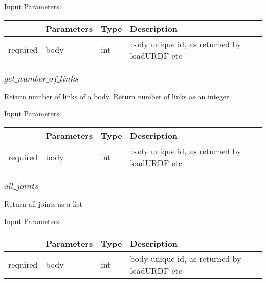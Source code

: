 \documentclass[
	ngerman,
	accentcolor=9c,%
	type=intern,
	marginpar=false
	]{tudapub}
\begin{document}
\vspace{0.5cm}
\noindent Input Parameters:
\vspace{0.5cm}

\begin{tabular}{|p{}|p{}|p{}| p{}|}
\hline
 & \textbf{Parameters} & \textbf{Type} & \textbf{Description} \\
\hline
required & body & int & body unique id, as returned by loadURDF etc\\
\hline
\end{tabular}
\vspace{0.5cm}



\subsubsection{$get\_number\_of\_links$}
\noindent Return number of links of a body. Return number of links as an integer


\vspace{0.5cm}
\noindent Input Parameters:
\vspace{0.5cm}

\begin{tabular}{|p{}|p{}|p{}| p{}|}
\hline
 & \textbf{Parameters} & \textbf{Type} & \textbf{Description} \\
\hline
required & body & int & body unique id, as returned by loadURDF etc\\
\hline
\end{tabular}
\vspace{0.5cm}






\subsubsection{$all\_joints$}
\noindent Return all joints as a list


\vspace{0.5cm}
\noindent Input Parameters:
\vspace{0.5cm}

\begin{tabular}{|p{}|p{}|p{}| p{}|}
\hline
 & \textbf{Parameters} & \textbf{Type} & \textbf{Description} \\
\hline
required & body & int & body unique id, as returned by loadURDF etc\\
\hline
\end{tabular}
\vspace{0.5cm}
\end{document}
